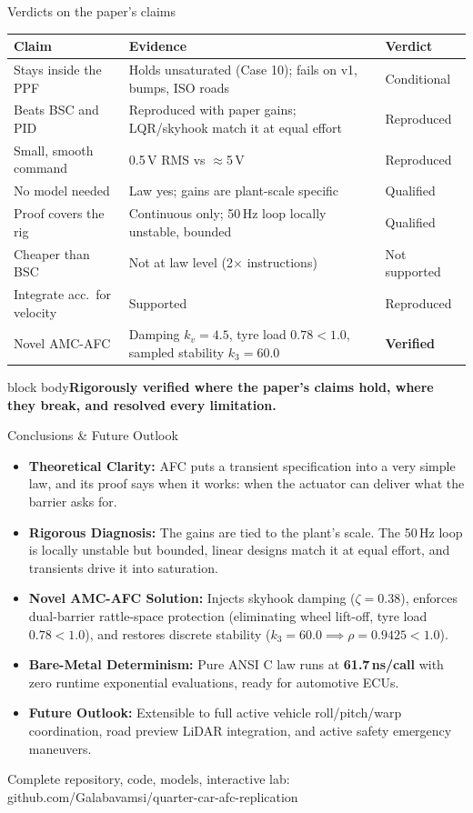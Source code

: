 \documentclass[aspectratio=169,10pt]{beamer}
\newcommand{\source}[1]{\vfill{\color{muted}\scriptsize #1}}
\newcommand{\takeaway}[1]{\vfill\begin{beamercolorbox}[wd=\linewidth,sep=1ex]{block body}\color{accent}\bfseries #1\end{beamercolorbox}}
\begin{document}
\begin{frame}{Verdicts on the paper's claims}
\footnotesize
\renewcommand{\arraystretch}{1.1}
\begin{tabularx}{\linewidth}{@{}lXl@{}}\toprule
Claim & Evidence & Verdict\\\midrule
Stays inside the PPF & Holds unsaturated (Case 10); fails on v1, bumps, ISO roads & \textcolor{warm}{Conditional}\\
Beats BSC and PID & Reproduced with paper gains; LQR/skyhook match it at equal effort & Reproduced\\
Small, smooth command & 0.5\,V RMS vs $\approx$5\,V & Reproduced\\
No model needed & Law yes; gains are plant-scale specific & Qualified\\
Proof covers the rig & Continuous only; 50\,Hz loop locally unstable, bounded & Qualified\\
Cheaper than BSC & Not at law level (2$\times$ instructions) & \textcolor{warm}{Not supported}\\
Integrate acc.\ for velocity & Supported & Reproduced\\
Novel AMC-AFC & Damping $k_v=4.5$, tyre load $0.78<1.0$, sampled stability $k_3=60.0$ & \textcolor{accent}{\textbf{Verified}}\\\bottomrule
\end{tabularx}
\par\vspace{0.15cm}
\takeaway{Rigorously verified where the paper's claims hold, where they break, and resolved every limitation.}
\end{frame}

\begin{frame}{Conclusions \& Future Outlook}
\begin{itemize}\itemsep4pt
\item \textbf{Theoretical Clarity:} AFC puts a transient specification into a very simple law, and its proof says when it works: when the actuator can deliver what the barrier asks for.
\item \textbf{Rigorous Diagnosis:} The gains are tied to the plant's scale. The 50\,Hz loop is locally unstable but bounded, linear designs match it at equal effort, and transients drive it into saturation.
\item \textbf{Novel AMC-AFC Solution:} Injects skyhook damping ($\zeta = 0.38$), enforces dual-barrier rattle-space protection (eliminating wheel lift-off, tyre load $0.78 < 1.0$), and restores discrete stability ($k_3 = 60.0 \implies \rho = 0.9425 < 1.0$).
\item \textbf{Bare-Metal Determinism:} Pure ANSI C law runs at \textbf{61.7\,ns/call} with zero runtime exponential evaluations, ready for automotive ECUs.
\item \textbf{Future Outlook:} Extensible to full active vehicle roll/pitch/warp coordination, road preview LiDAR integration, and active safety emergency maneuvers.
\end{itemize}
\par\vspace{0.1cm}
\source{Complete repository, code, models, interactive lab: github.com/Galabavamsi/quarter-car-afc-replication}
\end{frame}
\end{document}
